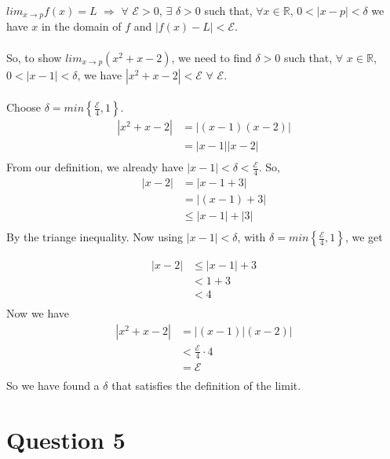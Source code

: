 \documentclass{article}
\begin{document}
\(lim_{x\to p} f(x) = L\) \(\Rightarrow\) \(\forall\) \(\mathcal{E} > 0\), \(\exists\) \(\delta > 0\) such that, \(\forall x \in \mathds{R}\), \(0 < |x-p| < \delta\) we have \(x\) in the domain of \(f\) and \(|f(x)-L| < \mathcal{E}\).
\\
\\
So, to show \(lim_{x\to p} (x^2 + x - 2)\), we need to find \(\delta > 0\) such that, \(\forall\) \(x \in \mathds{R}\), \(0<|x-1|<\delta\), we have \(|x^2+x-2| < \mathcal{E}\) \(\forall\) \(\mathcal{E}\).
\\
\\
Choose \(\delta = min\left\{\frac{\mathcal{E}}{4},1\right\}\).
\\
\begin{align*}
  |x^2 + x - 2| &= |(x-1)(x-2)| \\
  &= |x-1||x-2|\\
\end{align*}
From our definition, we already have \(|x-1| < \delta < \frac{\mathcal{E}}{4}\). So,
\\
\begin{align*}
  |x-2| &= |x-1+3| \\
  &= |(x-1)+3| \\
  &\leq |x-1| + |3| \\
\end{align*}
By the triange inequality. Now using \(|x-1| < \delta\), with \(\delta = min\left\{\frac{\mathcal{E}}{4},1\right\}\), we get

\begin{align*}
	|x-2| &\leq |x-1| + 3 \\
	&< 1 + 3 \\
	&< 4 \\
\end{align*}
Now we have
\begin{align*}
	|x^2 + x - 2| &= |(x-1)|(x-2)| \\
	&< \frac{\mathcal{E}}{4}\cdot4 \\
	&= \mathcal{E}\\
\end{align*}
So we have found a \(\delta\) that satisfies the definition of the limit.
\section*{Question 5}
\end{document}
